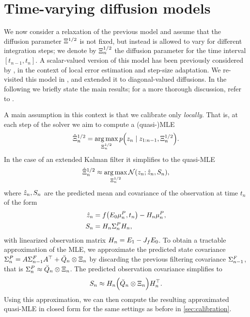 \documentclass{mimosis}
\begin{document}
\section{Time-varying diffusion models}
\label{sec:orgdbfea48}
\label{sec:calibration:local}
We now consider a relaxation of the previous model and assume that the diffusion parameter \(\Xi^{1/2}\) is not fixed, but instead is allowed to vary for different integration steps;
we denote by \(\Xi^{1/2}_n\) the diffusion parameter for the time interval \([t_{n-1}, t_n]\).
A scalar-valued version of this model has been previously considered by
\textcite{schober16_probab_model_numer_solut_initial_value_probl},
in the context of local error estimation and step-size adaptation.
We re-visited this model in
\capos{},
and extended it to diagonal-valued diffusions.
In the following we briefly state the main results;
for a more thorough discussion, refer to \capos{}.

A main assumption in this context is that we calibrate only \emph{locally}. That is, at each step of the solver we aim to compute a (quasi-)MLE
\begin{equation}
  \DiffHat_n = \argmax_{\Diff_n} \p(\obs_n \mid \obs_{1:n-1}, \Diff_n).
\end{equation}
In the case of an extended Kalman filter it simplifies to the quasi-MLE
\begin{equation}
  \DiffHat_n \approx \argmax_{\Diff_n} \N( \obs_n; \hat{\obs}_n, S_n),
\end{equation}
where \(\hat{z}_n, S_n\) are the predicted mean and covariance of the observation at time \(t_n\) of the form
\begin{subequations}
\begin{align}
  \hat{\obs}_n &= \vf(\proj{0} \mean{n}^P, t_n) - \obsA_n \mean{n}^P, \\
  S_n &= \obsA_n \cov{n}^P \obsA_n,
\end{align}
\end{subequations}
with linearized observation matrix
\(\obsA_n = \proj{1} - \jac{\vf} \proj{0}\).
To obtain a tractable approximation of the MLE, we approximate the predicted state covariance \(\Sigma_{n}^P = A \Sigma_{n-1}^F A^\top + \breve{Q}_n \otimes \Xi_n\) by discarding the previous filtering covariance \(\Sigma_{n-1}^F\),
that is \(\Sigma_{n}^P \approx \breve{Q}_n \otimes \Xi_n\).
The predicted observation covariance simplifies to
\begin{equation}
  S_n \approx \obsA_n \left( \breve{\transC}_n \otimes \DiffSq_n \right) \obsA_n^\T.
\end{equation}
Using this approximation, we can then compute the resulting approximated quasi-MLE in closed form for the same settings as before in \cref{sec:calibration}.
\end{document}

